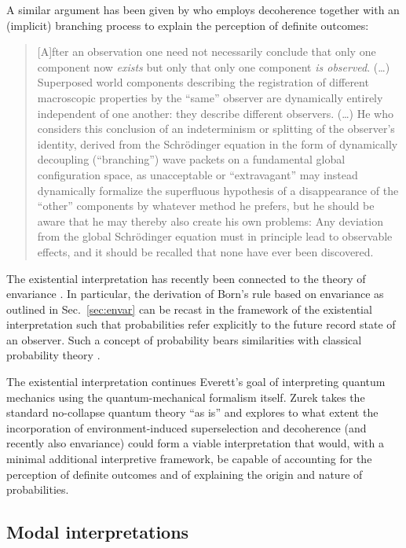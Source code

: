 \documentclass[twocolumn,rmp,aps,amsmath,amsfonts,noshowkeys,noshowpacs]{revtex4}
\begin{document}
A similar argument has been given by \citet{Zeh:1993:lt} who
employs decoherence together with an (implicit) branching process to
explain the perception of definite outcomes: 
%
\begin{quote} {\small
    [A]fter an observation one need not necessarily conclude that only
    one component now \emph{exists} but only that only one component
    \emph{is observed}.  (\dots) Superposed world components
    describing the registration of different macroscopic properties by
    the ``same'' observer are dynamically entirely independent of one
    another: they describe different observers. (\dots) He who
    considers this conclusion of an indeterminism or splitting of the
    observer's identity, derived from the Schr\"odinger equation in
    the form of dynamically decoupling (``branching'') wave packets on a
    fundamental global configuration space, as unacceptable or
    ``extravagant'' may instead dynamically formalize the superfluous
    hypothesis of a disappearance of the ``other'' components by
    whatever method he prefers, but he should be aware that he may
    thereby also create his own problems: Any deviation from the
    global Schr\"odinger equation must in principle lead to observable
    effects, and it should be recalled that none have ever been
    discovered.
}\end{quote}
%
The existential interpretation has recently been connected to the
theory of envariance \citep[see][and
Sec.~\ref{sec:envar}]{Zurek:2004:yb}. In particular, the derivation of
Born's rule based on envariance as outlined in Sec.~\ref{sec:envar}
can be recast in the framework of the existential interpretation such
that probabilities refer explicitly to the future record state of an
observer. Such a concept of probability  bears similarities with
classical probability theory \citep[for more details on these ideas,
see][]{Zurek:2004:yb}.

The existential interpretation continues Everett's goal of
interpreting quantum mechanics using the quantum-mechanical formalism
itself. Zurek takes the standard no-collapse quantum theory ``as is''
and explores to what extent the incorporation of environment-induced
superselection and decoherence (and recently also envariance) could
form a viable interpretation that would, with a minimal additional
interpretive framework, be capable of accounting for the perception of
definite outcomes and of explaining the origin and nature of
probabilities.


\subsection{Modal interpretations}
\end{document}
